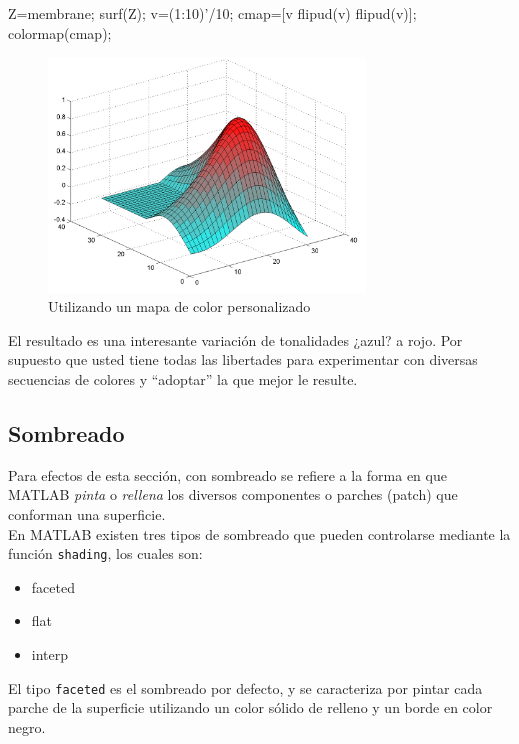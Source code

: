 \begin{matlab}
Z=membrane;
surf(Z);
v=(1:10)'/10;
cmap=[v flipud(v) flipud(v)];
colormap(cmap);
\end{matlab}

\begin{figure}[htbp]
    \centering
    \includegraphics[width=0.75\textwidth]{src/img/ch4/img_4_11.png}
    \caption{Utilizando un mapa de color personalizado}
    \label{fig:img_4_11}
\end{figure}

El resultado es una interesante variación de tonalidades ¿azul? a rojo.
Por supuesto que usted tiene todas las libertades para experimentar con
diversas secuencias de colores y ``adoptar'' la que mejor le resulte.

\subsection{Sombreado}

Para efectos de esta sección, con sombreado se refiere a la forma en que
MATLAB \emph{pinta} o \emph{rellena} los diversos componentes o parches
(patch) que conforman una superficie. \\

En MATLAB existen tres tipos de sombreado que pueden controlarse
mediante la función \texttt{shading}, los cuales son:

\begin{itemize}
\tightlist
\item
  faceted
\item
  flat
\item
  interp
\end{itemize}

El tipo \texttt{faceted} es el sombreado por defecto, y se caracteriza
por pintar cada parche de la superficie utilizando un color sólido de
relleno y un borde en color negro. \\

